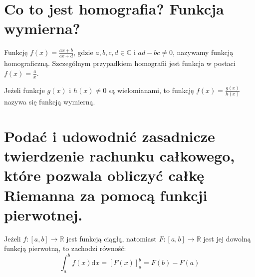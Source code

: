 \documentclass{article}
\numberwithin{equation}{section}
\theoremstyle{definition}
\theoremstyle{case}
\DeclareMathOperator{\tg}{tg}
\DeclareMathOperator{\ctg}{ctg}
\begin{document}
\begin{multicols}{2}
\end{multicols}

\section{Co to jest homografia? Funkcja wymierna?}
Funkcję $f(x) = \frac{ax+b}{cx+d}$, gdzie $a,b,c,d \in \mathbb{C}$ i $ad-bc \neq 0$, nazywamy funkcją homograficzną. Szczególnym przypadkiem homografii jest funkcja w postaci $f(x) = \frac{a}{x}$.

Jeżeli funkcje $g(x)$ i $h(x) \neq 0$ są wielomianami, to funkcję $f(x)=\frac{g(x)}{h(x)}$ nazywa się funkcją wymierną.

\setcounter{section}{63}
\section{Podać i udowodnić zasadnicze twierdzenie rachunku całkowego,
które pozwala obliczyć całkę Riemanna za pomocą funkcji pierwotnej.}
Jeżeli ${f \colon [a,b] \to \mathbb{R}}$ jest funkcją ciągłą, natomiast ${F \colon [a,b] \to \mathbb{R}}$
jest jej dowolną funkcją pierwotną, to zachodzi równość:
\begin{equation*}
	\int_a^b f(x) \mathrm{d}x = [ F(x) ]_a^b = F(b) - F(a)
\end{equation*}
\end{document}
